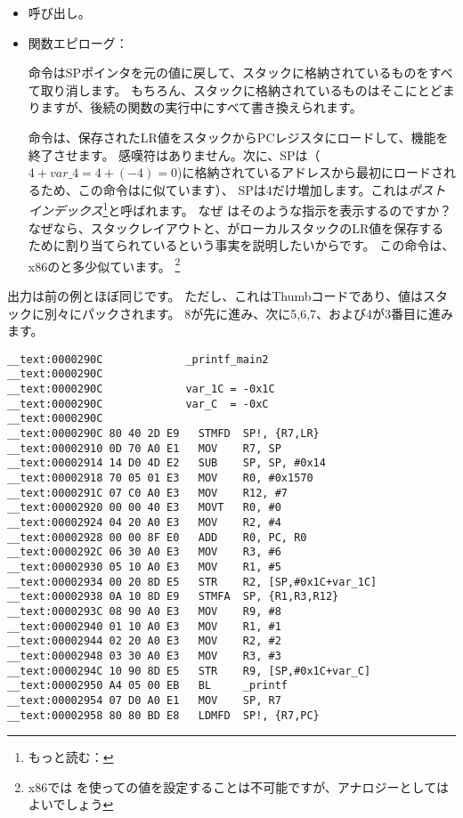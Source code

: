 \begin{itemize}
\item \printf 呼び出し。

\item 関数エピローグ：

命令は\ac{SP}ポインタを元の値に戻して、スタックに格納されているものをすべて取り消します。
もちろん、スタックに格納されているものはそこにとどまりますが、後続の関数の実行中にすべて書き換えられます。

命令は、保存された\ac{LR}値をスタックから\ac{PC}レジスタにロードして、機能を終了させます。
感嘆符はありません。次に、\ac{SP}は（$4+var\_4=4+(-4)=0$)に格納されているアドレスから最初にロードされるため、この命令はに似ています）、 \ac{SP}は4だけ増加します。これは\emph{ポストインデックス}\footnote{もっと読む： }と呼ばれます。
なぜ \IDA はそのような指示を表示するのですか？
なぜなら、スタックレイアウトと、がローカルスタックの\ac{LR}値を保存するために割り当てられているという事実を説明したいからです。
この命令は、x86のと多少似ています。
\footnote{x86では \POP を使っての値を設定することは不可能ですが、アナロジーとしてはよいでしょう}

\end{itemize}

\myparagraph{\OptimizingKeilVI: \ThumbMode}



出力は前の例とほぼ同じです。 ただし、これはThumbコードであり、値はスタックに別々にパックされます。
8が先に進み、次に5,6,7、および4が3番目に進みます。

\myparagraph{\OptimizingXcodeIV: \ARMMode}

\begin{lstlisting}[style=customasmARM]
__text:0000290C             _printf_main2
__text:0000290C
__text:0000290C             var_1C = -0x1C
__text:0000290C             var_C  = -0xC
__text:0000290C
__text:0000290C 80 40 2D E9   STMFD  SP!, {R7,LR}
__text:00002910 0D 70 A0 E1   MOV    R7, SP
__text:00002914 14 D0 4D E2   SUB    SP, SP, #0x14
__text:00002918 70 05 01 E3   MOV    R0, #0x1570
__text:0000291C 07 C0 A0 E3   MOV    R12, #7
__text:00002920 00 00 40 E3   MOVT   R0, #0
__text:00002924 04 20 A0 E3   MOV    R2, #4
__text:00002928 00 00 8F E0   ADD    R0, PC, R0
__text:0000292C 06 30 A0 E3   MOV    R3, #6
__text:00002930 05 10 A0 E3   MOV    R1, #5
__text:00002934 00 20 8D E5   STR    R2, [SP,#0x1C+var_1C]
__text:00002938 0A 10 8D E9   STMFA  SP, {R1,R3,R12}
__text:0000293C 08 90 A0 E3   MOV    R9, #8
__text:00002940 01 10 A0 E3   MOV    R1, #1
__text:00002944 02 20 A0 E3   MOV    R2, #2
__text:00002948 03 30 A0 E3   MOV    R3, #3
__text:0000294C 10 90 8D E5   STR    R9, [SP,#0x1C+var_C]
__text:00002950 A4 05 00 EB   BL     _printf
__text:00002954 07 D0 A0 E1   MOV    SP, R7
__text:00002958 80 80 BD E8   LDMFD  SP!, {R7,PC}
\end{lstlisting}

